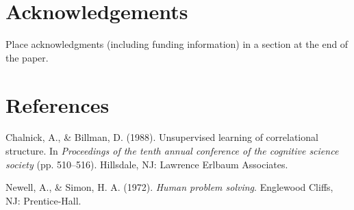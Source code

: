 \documentclass[10pt, letterpaper]{article}
\begin{document}
\hypertarget{acknowledgements}{%
\section{Acknowledgements}\label{acknowledgements}}

Place acknowledgments (including funding information) in a section at
the end of the paper.

\hypertarget{references}{%
\section{References}\label{references}}

\setlength{\parindent}{-0.1in} 
\setlength{\leftskip}{0.125in}

\noindent

\hypertarget{refs}{}
\leavevmode\hypertarget{ref-ChalnickBillman1988a}{}%
Chalnick, A., \& Billman, D. (1988). Unsupervised learning of
correlational structure. In \emph{Proceedings of the tenth annual
conference of the cognitive science society} (pp. 510--516). Hillsdale,
NJ: Lawrence Erlbaum Associates.

\leavevmode\hypertarget{ref-NewellSimon1972a}{}%
Newell, A., \& Simon, H. A. (1972). \emph{Human problem solving}.
Englewood Cliffs, NJ: Prentice-Hall.


\end{document}
